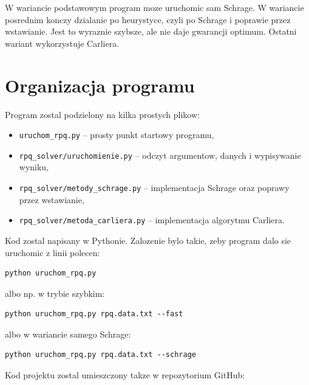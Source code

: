 \documentclass[12pt,a4paper]{article}
\begin{document}
W wariancie podstawowym program moze uruchomic sam Schrage. W wariancie posrednim konczy dzialanie po heurystyce, czyli po Schrage i poprawie przez wstawianie. Jest to wyraznie szybsze, ale nie daje gwarancji optimum. Ostatni wariant wykorzystuje Carliera.

\section{Organizacja programu}

Program zostal podzielony na kilka prostych plikow:

\begin{itemize}
    \item \texttt{uruchom\_rpq.py} -- prosty punkt startowy programu,
    \item \texttt{rpq\_solver/uruchomienie.py} -- odczyt argumentow, danych i wypisywanie wyniku,
    \item \texttt{rpq\_solver/metody\_schrage.py} -- implementacja Schrage oraz poprawy przez wstawianie,
    \item \texttt{rpq\_solver/metoda\_carliera.py} -- implementacja algorytmu Carliera.
\end{itemize}

Kod zostal napisany w Pythonie. Zalozenie bylo takie, zeby program dalo sie uruchomic z linii polecen:

\begin{verbatim}
python uruchom_rpq.py
\end{verbatim}

albo np. w trybie szybkim:

\begin{verbatim}
python uruchom_rpq.py rpq.data.txt --fast
\end{verbatim}

albo w wariancie samego Schrage:

\begin{verbatim}
python uruchom_rpq.py rpq.data.txt --schrage
\end{verbatim}

Kod projektu zostal umieszczony takze w repozytorium GitHub:

\begin{center}
\end{center}
\end{document}
